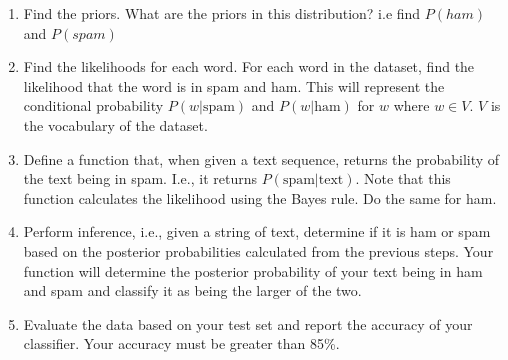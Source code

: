 \documentclass[a3paper,12pt]{article} %
\begin{document}
\begin{enumerate}
    \item Find the priors. What are the priors in this distribution? i.e find $P(ham)$ and $P(spam)$
    \item Find the likelihoods for each word. For each word in the dataset, find the likelihood that the word is in spam and ham.
This will represent the conditional probability \( P(w|\text{spam}) \) and \( P(w|\text{ham}) \) for \( w \) where $w \in V $.
$V$ is the vocabulary of the dataset.

\item Define a function that, when given a text sequence, returns the probability of the text being in spam. I.e., it returns \( P(\text{spam}|\text{text}) \). Note that this function calculates the likelihood using the Bayes rule. Do the same for ham.


\item Perform inference, i.e., given a string of text, determine if it is ham or spam based on the posterior probabilities calculated from the previous steps. Your function will determine the posterior probability of your text being in ham and spam and classify it as being the larger of the two.


\item Evaluate the data based on your test set and report the accuracy of your classifier. Your accuracy must be greater than 85\%. 


\end{enumerate}
\end{document}
